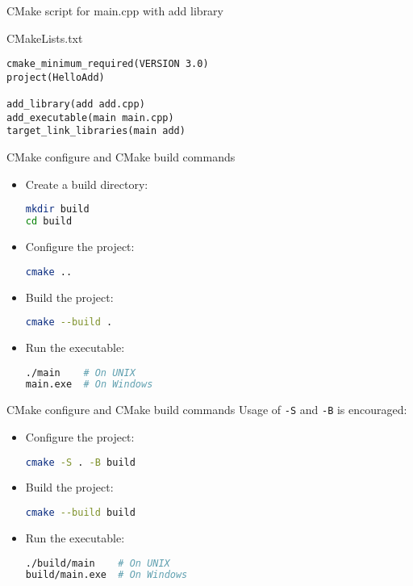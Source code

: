 \documentclass{beamer}
\begin{document}
\begin{frame}[fragile]{CMake script for main.cpp with add library}
  \begin{block}{CMakeLists.txt}
    \begin{lstlisting}
cmake_minimum_required(VERSION 3.0)
project(HelloAdd)

add_library(add add.cpp)
add_executable(main main.cpp)
target_link_libraries(main add)
    \end{lstlisting}
  \end{block}
\end{frame}

\begin{frame}[fragile]{CMake configure and CMake build commands}
  \begin{itemize}
    \item Create a build directory:
    \begin{lstlisting}[language=bash]
mkdir build
cd build
    \end{lstlisting}
    \item Configure the project:
    \begin{lstlisting}[language=bash]
cmake ..
    \end{lstlisting}
    \item Build the project:
    \begin{lstlisting}[language=bash]
cmake --build .
    \end{lstlisting}
    \item Run the executable:
    \begin{lstlisting}[language=bash]
./main    # On UNIX
main.exe  # On Windows
    \end{lstlisting}
  \end{itemize}
\end{frame}

\begin{frame}[fragile]{CMake configure and CMake build commands}
  Usage of \texttt{-S} and \texttt{-B} is encouraged:

  \begin{itemize}
    \item Configure the project:
    \begin{lstlisting}[language=bash]
cmake -S . -B build
    \end{lstlisting}
    \item Build the project:
    \begin{lstlisting}[language=bash]
cmake --build build
    \end{lstlisting}
    \item Run the executable:
    \begin{lstlisting}[language=bash]
./build/main    # On UNIX
build/main.exe  # On Windows
    \end{lstlisting}
  \end{itemize}
\end{frame}
\end{document}

